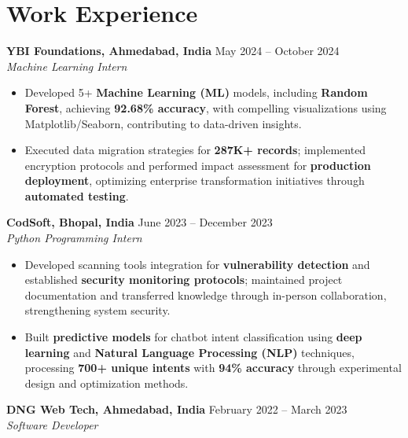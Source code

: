 \documentclass[a4paper,10pt]{article}
\begin{document}
\section*{Work Experience}
\textbf{YBI Foundations, Ahmedabad, India} \hfill May 2024 -- October 2024\\
\textit{Machine Learning Intern} \\
\begin{itemize}[leftmargin=*, itemsep=0pt, parsep=1pt]
\vspace{-6mm}
\item Developed 5+ \textbf{Machine Learning (ML)} models, including \textbf{Random Forest}, achieving \textbf{92.68\% accuracy}, with compelling visualizations using Matplotlib/Seaborn, contributing to data-driven insights.
\item Executed data migration strategies for \textbf{287K+ records}; implemented encryption protocols and performed impact assessment for \textbf{production deployment}, optimizing enterprise transformation initiatives through \textbf{automated testing}.
\end{itemize}
\textbf{CodSoft, Bhopal, India} \hfill June 2023 -- December 2023\\
\textit{Python Programming Intern} \\
\begin{itemize}[leftmargin=*, itemsep=0pt, parsep=1pt]
\vspace{-6mm}
\item Developed scanning tools integration for \textbf{vulnerability detection} and established \textbf{security monitoring protocols}; maintained project documentation and transferred knowledge through in-person collaboration, strengthening system security.
\item Built \textbf{predictive models} for chatbot intent classification using \textbf{deep learning} and \textbf{Natural Language Processing (NLP)} techniques, processing \textbf{700+ unique intents} with \textbf{94\% accuracy} through experimental design and optimization methods.
\vspace{-1mm}
\end{itemize}

\textbf{DNG Web Tech, Ahmedabad, India} \hfill February 2022 -- March 2023 \\
\textit{Software Developer} \\
\end{document}
